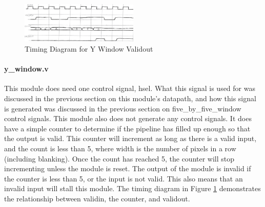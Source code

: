 \begin{figure}
    \includegraphics[width=0.5\textwidth]{processed_image_pngs/timing_2.png}
    \caption{Timing Diagram for Y Window Validout}
    \label{fig:timing_2}
\end{figure}


\paragraph{y\_window.v}
This module does need one control signal, hsel. What this signal is used for was 
discussed in the previous section on this module's datapath, and how this 
signal is generated was discussed in the previous section on five\_by\_five\_window 
control signals. This module also does not generate any control signals. It does 
have a simple counter to determine if the pipeline has filled up enough so that 
the output is valid. This counter will increment as long as there is a valid 
input, and the count is less than 5, where width is the number of pixels in 
a row (including blanking). Once the count has reached 5, the counter will stop 
incrementing unless the module is reset. The output of the module is invalid if 
the counter is less than 5, or the input is not valid. This also means that an 
invalid input will stall this module. The timing diagram in Figure \ref{fig:timing_2} 
demonstrates the relationship between validin, the counter, and validout.



